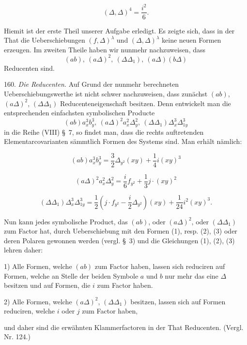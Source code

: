 \documentclass[11pt]{article}
\providecommand{\weberpage}[1]{}
\providecommand{\weq}[2]{\begin{equation}\tag{#1}#2\end{equation}}
\let\Delta\varDelta
\begin{document}
\weq{4}{(\Delta,\Delta)^4 = \frac{i^2}{6}.}

Hiemit ist der erste Theil unserer Aufgabe erledigt. Es zeigte sich, dass in der That die Ueberschiebungen $(f,\Delta)^\lambda$ und $(\Delta,\Delta)^\lambda$ keine neuen Formen erzeugen. Im zweiten Theile haben wir nunmehr nachzuweisen, dass
\[
(ab),\ (a\Delta)^2,\ (\Delta\Delta_1),\ (a\Delta)(b\Delta)
\]
Reducenten sind.

160. \textit{Die Reducenten.} Auf Grund der nunmehr berechneten Ueberschiebungswerthe ist nicht schwer nachzuweisen, dass zunächst $(ab)$, $(a\Delta)^2$, $(\Delta\Delta_1)$ Reducenteneigenschaft besitzen. Denn entwickelt man die entsprechenden einfachsten symbolischen Producte
\[
(ab)a_x^3 b_y^3,\ (a\Delta)^2 a_x^2 \Delta_y^2,\ (\Delta\Delta_1)\Delta_x^3\Delta_{1y}^3
\]
in die Reihe (VIII) \S~7, so findet man, dass die rechts auftretenden Elementarcovarianten sämmtlich Formen des Systems sind. Man erhält nämlich:


\weberpage{182}

\weq{1}{(ab)a_x^3 b_y^3 = \frac{3}{2}\Delta_{y^2}(xy) + \frac{1}{4} i(xy)^3}

\weq{2}{(a\Delta)^2 a_x^2 \Delta_y^2 = \frac{i}{6} f_{y^2} + \frac{1}{3} j\cdot(xy)^2}

\weq{3}{(\Delta\Delta_1)\Delta_x^3\Delta_{1y}^3 = \frac{1}{2}\left(j\cdot f_{y^2} - \frac{i}{2}\Delta_{y^2}\right)(xy) + \frac{1}{24} i^2 (xy)^3.}

Nun kann jedes symbolische Product, das $(ab)$, oder $(a\Delta)^2$, oder $(\Delta\Delta_1)$ zum Factor hat, durch Ueberschiebung mit den Formen (1), resp. (2), (3) oder deren Polaren gewonnen werden (vergl. \S~3) und die Gleichungen (1), (2), (3) lehren daher:

1) Alle Formen, welche $(ab)$ zum Factor haben, lassen sich reduciren auf Formen, welche an Stelle der beiden Symbole $a$ und $b$ nur mehr das eine $\Delta$ besitzen und auf Formen, die $i$ zum Factor haben.

2) Alle Formen, welche $(a\Delta)^2$, $(\Delta\Delta_1)$ besitzen, lassen sich auf Formen reduciren, welche $i$ oder $j$ zum Factor haben,

und daher sind die erwähnten Klammerfactoren in der That Reducenten. (Vergl. Nr. 124.)
\end{document}
